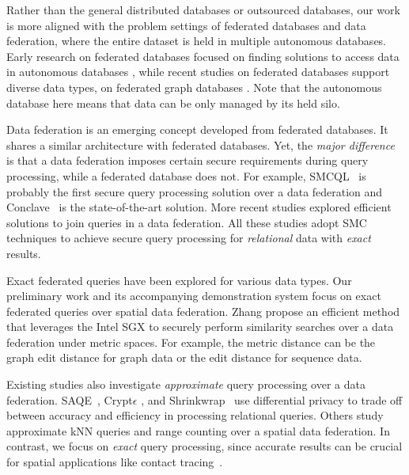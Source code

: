 Rather than the general distributed databases or outsourced databases, our work is more aligned with the problem settings of federated databases and data federation, where the entire dataset is held in multiple autonomous databases.
Early research on federated databases focused on finding solutions to access data in autonomous databases \cite{DBLP:books/sp/OzsuV20}, while recent studies on federated databases support diverse data types, \eg on federated graph databases \cite{DBLP:conf/www/VuAEJ19}. 
Note that the autonomous database here means that data can be only managed by its held silo. 

Data federation is an emerging concept developed from federated databases. 
It shares a similar architecture with federated databases.
Yet, the \textit{major difference} is that a data federation imposes certain secure requirements during query processing, while a federated database does not.
For example, SMCQL~\cite{vldb17smcql} is probably the first secure query processing solution over a data federation and Conclave~\cite{eurosys19conclave} is the state-of-the-art solution.
More recent studies explored efficient solutions to join queries \cite{DBLP:conf/sigmod/Wang021, 10463171, DBLP:conf/icde/HanZFLL22} in a data federation.
All these studies adopt SMC techniques to achieve secure query processing for \textit{relational} data with \textit{exact} results.

Exact federated queries have been explored for various data types. 
Our preliminary work \cite{DBLP:journals/pvldb/TongPZSXZZCXXL22} and its accompanying demonstration system \cite{DBLP:journals/pvldb/PanTXZDZSZCXXL22} focus on exact federated queries over spatial data federation.
Zhang \etal \cite{DBLP:journals/pacmmod/ZhangWXPX24} propose an efficient method that leverages the Intel SGX to securely perform similarity searches over a data federation under metric spaces.
For example, the metric distance can be the graph edit distance for graph data or the edit distance for sequence data. 

Existing studies also investigate \textit{approximate} query processing over a data federation.
SAQE~\cite{DBLP:journals/pvldb/BaterP0WR20}, Crypt$\epsilon$ \cite{DBLP:conf/sigmod/ChowdhuryW0MJ20}, and Shrinkwrap~\cite{DBLP:journals/pvldb/BaterHEMR18} use differential privacy to trade off between accuracy and efficiency in processing relational queries.
Others study approximate kNN queries \cite{DBLP:conf/dasfaa/ZhangTSZXCZXLZ23} and range counting \cite{DBLP:conf/dasfaa/LiZC23,tkde21shi} over a spatial data federation.
In contrast, we focus on \textit{exact} query processing, since accurate results can be crucial for spatial applications like contact tracing~\cite{2020quantifying}. 

